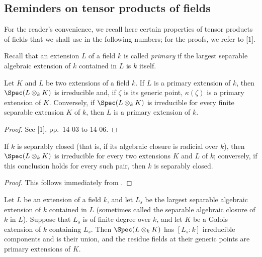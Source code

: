 
\subsection{Reminders on tensor products of fields}
\label{subsection:IV.4.3}

For the reader's convenience, we recall here certain properties of
tensor products of fields that we shall use in the following numbers;
for the proofs, we refer to [1].

\begin{env}[4.3.1]
\label{IV.4.3.1}
Recall that an extension $L$ of a field $k$ is called
\emph{primary} if the largest separable algebraic extension of $k$
contained in $L$ is $k$ itself.
\end{env}

\begin{proposition}[4.3.2]
\label{IV.4.3.2}
Let $K$ and $L$ be two extensions of a field $k$.
If $L$ is a primary extension of $k$, then
$\Spec(L\otimes_k K)$ is irreducible and, if $\zeta$ is its generic
point, $\kappa(\zeta)$ is a primary extension of $K$.
Conversely, if $\Spec(L\otimes_k K)$ is irreducible for every finite
separable extension $K$ of $k$, then $L$ is a primary extension of $k$.
\end{proposition}

\begin{proof}
See [1], pp.~14-03 to 14-06.
\end{proof}

\begin{corollary}[4.3.3]
\label{IV.4.3.3}
If $k$ is separably closed (that is, if its algebraic closure is
radicial over $k$), then $\Spec(L\otimes_k K)$ is irreducible for every
two extensions $K$ and $L$ of $k$; conversely, if this conclusion holds
for every such pair, then $k$ is separably closed.
\end{corollary}

\begin{proof}
This follows immediately from .
\end{proof}

\begin{corollary}[4.3.4]
\label{IV.4.3.4}
Let $L$ be an extension of a field $k$, and let $L_s$ be the largest
separable algebraic extension of $k$ contained in $L$ (sometimes called
the separable algebraic closure of $k$ in $L$).
Suppose that $L_s$ is of finite degree over $k$, and let $K$ be a
Galois extension of $k$ containing $L_s$.
Then $\Spec(L\otimes_k K)$ has $[L_s:k]$ irreducible components and is
their union, and the residue fields at their generic points are primary
extensions of $K$.
\end{corollary}

